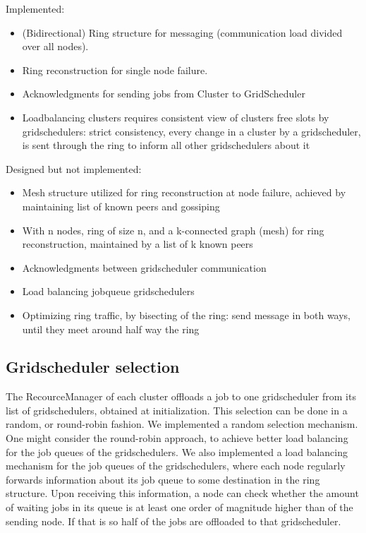 \documentclass[twocolumn,a4paper]{article}
\begin{document}
Implemented:
\begin{itemize}
	\item (Bidirectional) Ring structure for messaging (communication load divided over all nodes).
	\item Ring reconstruction for single node failure.
	\item Acknowledgments for sending jobs from Cluster to GridScheduler
	\item Loadbalancing clusters requires consistent view of clusters free slots by gridschedulers: strict consistency, every change in a cluster by a gridscheduler, is sent through the ring to inform all other gridschedulers about it
\end{itemize}

Designed but not implemented:
\begin{itemize}
	\item Mesh structure utilized for ring reconstruction at node failure, achieved by maintaining list of known peers and gossiping
	\item With n nodes, ring of size n, and a k-connected graph (mesh) for ring reconstruction, maintained by a list of k known peers
	\item Acknowledgments between gridscheduler communication
	\item Load balancing jobqueue gridschedulers
	\item Optimizing ring traffic, by bisecting of the ring: send message in both ways, until they meet around half way the ring
\end{itemize}

\subsection{Gridscheduler selection}
The RecourceManager of each cluster offloads a job to one gridscheduler from its list of gridschedulers, obtained at initialization. This selection can be done in a random, or round-robin fashion. We implemented a random selection mechanism. One might consider the round-robin approach, to achieve better load balancing for the job queues of the gridschedulers. We also implemented a load balancing mechanism for the job queues of the gridschedulers, where each node regularly forwards information about its job queue to some destination in the ring structure. Upon receiving this information, a node can check whether the amount of waiting jobs in its queue is at least one order of magnitude higher than of the sending node. If that is so half of the jobs are offloaded to that gridscheduler.
\end{document}
